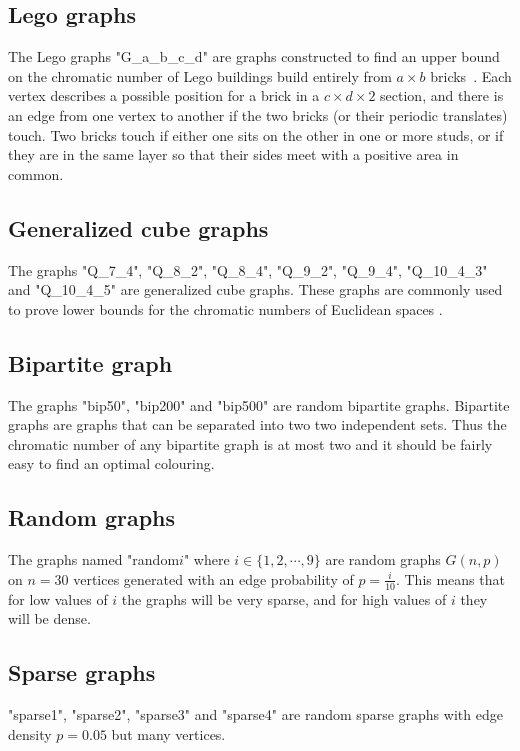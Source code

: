 \subsection{Lego graphs}
The Lego graphs "G\_a\_b\_c\_d" are graphs constructed to find an upper bound on the chromatic number of Lego buildings build entirely from $a\times b$ bricks~\cite{Lego}. Each vertex describes a possible position for a brick in a $c\times d \times 2$ section, and there is an edge from one vertex to another if the two bricks (or their periodic translates) touch. Two bricks touch if either one sits on the other in one or more studs, or if they are in the same layer so that their sides meet with a positive area in common.
\subsection{Generalized cube graphs}
The graphs "Q\_7\_4", "Q\_8\_2", "Q\_8\_4", "Q\_9\_2", "Q\_9\_4", "Q\_10\_4\_3" and "Q\_10\_4\_5" are generalized cube graphs. These graphs are commonly used to prove lower bounds for the chromatic numbers of Euclidean spaces \cite{kahle2015new}. 
\subsection{Bipartite graph}  
The graphs "bip50", "bip200" and "bip500" are random bipartite graphs. Bipartite graphs are graphs that can be separated into two two independent sets. Thus the chromatic number of any bipartite graph is at most two and it should be fairly easy to find an optimal colouring.
\subsection{Random graphs}
The graphs named "random$i$" where $i \in \{1,2,\cdots,9\}$ are random graphs $G(n,p)$ on $n=30$ vertices generated with an edge probability of $p=\frac{i}{10}$. This means that for low values of $i$ the graphs will be very sparse, and for high values of $i$ they will be dense.
\subsection{Sparse graphs}
"sparse1", "sparse2", "sparse3" and "sparse4" are random sparse graphs with edge density $p=0.05$ but many vertices. 
